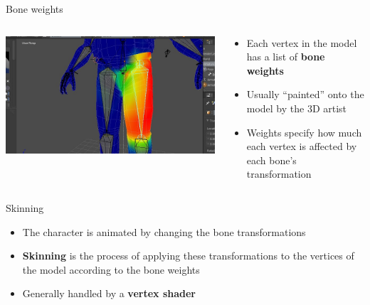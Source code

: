 \begin{frame}{Bone weights}
	\begin{columns}
		\begin{column}{0.4\textwidth}
			\includegraphics[width=\textwidth]{bone_weights}
		\end{column}
		\begin{column}{0.58\textwidth}
			\begin{itemize}
				\pause\item Each vertex in the model has a list of \textbf{bone weights}
				\pause\item Usually ``painted'' onto the model by the 3D artist
				\pause\item Weights specify how much each vertex is affected by each bone's transformation
			\end{itemize}
		\end{column}
	\end{columns}
\end{frame}

\begin{frame}{Skinning}
	\begin{itemize}
		\pause\item The character is animated by changing the bone transformations
		\pause\item \textbf{Skinning} is the process of applying these transformations to the vertices of the model
			according to the bone weights
		\pause\item Generally handled by a \textbf{vertex shader}
	\end{itemize}
\end{frame}

